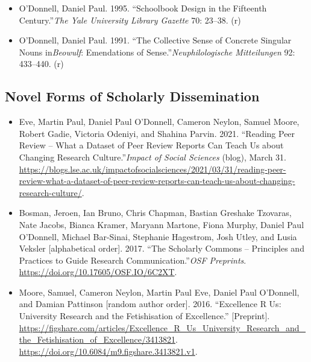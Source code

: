 \documentclass[12pt]{article}
\begin{document}
\begin{itemize}
  \item O'Donnell, Daniel Paul\*. 1995. “Schoolbook Design in the Fifteenth Century.”\textit{The Yale University Library Gazette} 70: 23–38. (r)
  \item O'Donnell, Daniel Paul\*. 1991. “The Collective Sense of Concrete Singular Nouns in\textit{Beowulf}: Emendations of Sense.”\textit{Neuphilologische Mitteilungen} 92: 433–440. (r)
\end{itemize}


\subsection*{Novel Forms of Scholarly Dissemination}

\begin{itemize}
  \item Eve, Martin Paul, Daniel Paul O’Donnell, Cameron Neylon, Samuel Moore, Robert Gadie, Victoria Odeniyi, and Shahina Parvin. 2021. “Reading Peer Review – What a Dataset of Peer Review Reports Can Teach Us about Changing Research Culture.”\textit{Impact of Social Sciences} (blog), March 31. \url{https://blogs.lse.ac.uk/impactofsocialsciences/2021/03/31/reading-peer-review-what-a-dataset-of-peer-review-reports-can-teach-us-about-changing-research-culture/}.
  \item Bosman, Jeroen, Ian Bruno, Chris Chapman, Bastian Greshake Tzovaras, Nate Jacobs, Bianca Kramer, Maryann Martone, Fiona Murphy, Daniel Paul O’Donnell, Michael Bar-Sinai, Stephanie Hagestrom, Josh Utley, and Lusia Veksler [alphabetical order]. 2017. “The Scholarly Commons – Principles and Practices to Guide Research Communication.”\textit{OSF Preprints}. \url{https://doi.org/10.17605/OSF.IO/6C2XT}.
  \item Moore, Samuel\*, Cameron Neylon, Martin Paul Eve, Daniel Paul O’Donnell, and Damian Pattinson [random author order]. 2016. “Excellence R Us: University Research and the Fetishisation of Excellence.” [Preprint]. \url{https://figshare.com/articles/Excellence_R_Us_University_Research_and_the_Fetishisation_of_Excellence/3413821}. \url{https://doi.org/10.6084/m9.figshare.3413821.v1}.
\end{itemize}
\end{document}
